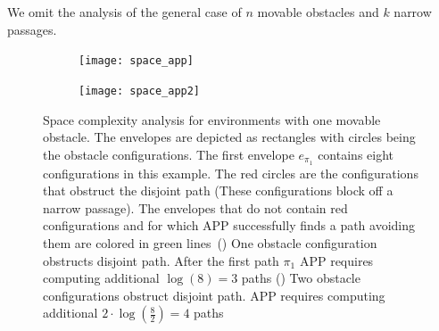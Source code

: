 \documentclass[a4paper]{report}
\begin{document}
We omit the analysis of the general case of $n$ movable obstacles and $k$ narrow passages.

\begin{figure}[H]
\begin{subfigure}{0.5\textwidth}
\centering
  \texttt{[image: space\_app]}
  \caption{}
  \label{fig:one_narrow}
\end{subfigure}
\hfill
\begin{subfigure}{0.5\textwidth}
\centering
  \texttt{[image: space\_app2]}
  \caption{}
  \label{fig:two_narrow}
\end{subfigure}
    \caption{Space complexity analysis for environments with one movable obstacle. The envelopes are depicted as rectangles with circles being the obstacle configurations. The first envelope $e_{\pi_1}$ contains eight configurations in this example. The red circles are the configurations that obstruct the disjoint path (These configurations block off a narrow passage). The envelopes that do not contain red configurations and for which APP successfully finds a path avoiding them are colored in green lines~() One obstacle configuration obstructs disjoint path. After the first path $\pi_1$ APP requires computing additional $\log (8) = 3$ paths () Two obstacle configurations obstruct disjoint path. APP requires computing additional $2 \cdot \log (\frac{8}{2}) = 4$ paths}
    \label{fig:app_space}
\end{figure}
\end{document}

